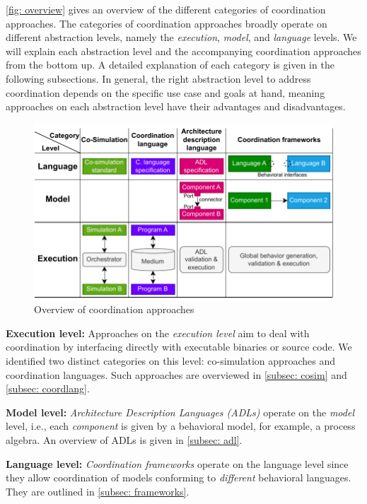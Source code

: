 \documentclass[runningheads]{llncs}
\begin{document}
\autoref{fig: overview} gives an overview of the different categories of coordination approaches.
The categories of coordination approaches broadly operate on different abstraction levels, namely the \textit{execution}, \textit{model}, and \textit{language} levels.
We will explain each abstraction level and the accompanying coordination approaches from the bottom up.
A detailed explanation of each category is given in the following subsections.
In general, the right abstraction level to address coordination depends on the specific use case and goals at hand, meaning approaches on each abstraction level have their advantages and disadvantages.

\begin{figure}[ht]
	\centering
	\includegraphics[width=1\textwidth]{images/overview}
	\caption{Overview of coordination approaches}
	\label{fig: overview}
\end{figure}

\textbf{Execution level:} Approaches on the \textit{execution level} aim to deal with coordination by interfacing directly with executable binaries or source code.
We identified two distinct categories on this level: co-simulation approaches and coordination languages.
Such approaches are overviewed in \autoref{subsec: cosim} and \autoref{subsec: coordlang}.

\textbf{Model level:}
\textit{Architecture Description Languages (ADLs)} operate on the \textit{model} level, i.e., each \textit{component} is given by a behavioral model, for example, a process algebra.
An overview of ADLs is given in \autoref{subsec: adl}.

\textbf{Language level:}
\textit{Coordination frameworks} operate on the language level since they allow coordination of models conforming to \textit{different} behavioral languages.
They are outlined in \autoref{subsec: frameworks}.
\end{document}
